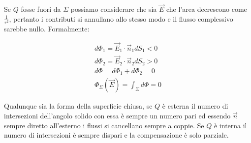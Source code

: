 \begin{figure}[htpb]
\end{figure}
\FloatBarrier

Se $Q$ fosse fuori da $\Sigma$ possiamo considerare che sia $\vec{E}$ che l'area decrescono come $ \frac{1}{r^2} $, pertanto i contributi si annullano allo stesso modo e il flusso complessivo sarebbe nullo. Formalmente:

\begin{gather*}
	d\Phi_1 = \vec{E}_1\cdot \vec{n}_1dS_1 < 0 \\
	d\Phi_2 = \vec{E}_2\cdot \vec{n}_2dS_2 > 0 \\
	d\Phi = d\Phi_1 + d\Phi_2 = 0 \\
	\Phi_{\Sigma}(\vec{E} ) = \int_{\Sigma}d\Phi = 0
\end{gather*}

Qualunque sia la forma della superficie chiusa, se $Q$ è esterna il numero di intersezioni dell'angolo solido con essa è sempre un numero pari ed essendo $\vec{n}$ sempre diretto all'esterno i flussi si cancellano sempre a coppie. Se $Q$ è interna il numero di intersezioni è sempre dispari e la compensazione è solo parziale.

